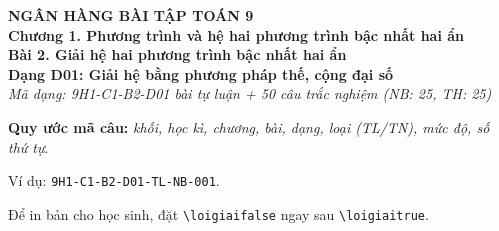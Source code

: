 \documentclass[12pt,a4paper]{article}
\newif\ifloigiai
\begin{document}
\begin{center}
{\Large\textbf{NGÂN HÀNG BÀI TẬP TOÁN 9}}\\[3pt]
\textbf{Chương 1. Phương trình và hệ hai phương trình bậc nhất hai ẩn}\\[2pt]
\textbf{Bài 2. Giải hệ hai phương trình bậc nhất hai ẩn}\\[2pt]
\textbf{Dạng D01: Giải hệ bằng phương pháp thế, cộng đại số}\\[2pt]
\textit{Mã dạng: 9H1-C1-B2-D01  bài tự luận + 50 câu trắc nghiệm \quad (NB: 25, TH: 25)}
\end{center}
\textbf{Quy ước mã câu:} \textit{khối, học kì, chương, bài, dạng, loại (TL/TN), mức độ, số thứ tự}.\par Ví dụ: \texttt{9H1-C1-B2-D01-TL-NB-001}.\par Để in bản cho học sinh, đặt \verb|\loigiaifalse| ngay sau \verb|\loigiaitrue|.
\end{document}
